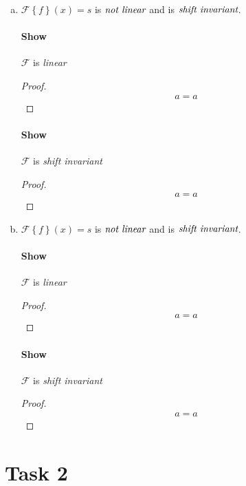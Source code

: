 \documentclass{paper}
\begin{document}
\begin{enumerate}[(a)]
\item $\mathcal{F} \left \{ f \right\} (x) = s$ is $\emph{not linear}$ and is $\emph{shift invariant}$.

\paragraph{Show} $\mathcal{F}$ is \emph{linear} \\
\begin{proof}
\begin{align*}
    a = a
\end{align*}
\end{proof}

\paragraph{Show} $\mathcal{F}$ is \emph{shift invariant} \\
\begin{proof}
\begin{align*}
    a = a
\end{align*}
\end{proof}

\item $\mathcal{F} \left \{ f \right\} (x) = s$ is $\emph{not linear}$ and is $\emph{shift invariant}$.

\paragraph{Show} $\mathcal{F}$ is \emph{linear} \\
\begin{proof}
\begin{align*}
    a = a
\end{align*}
\end{proof}

\paragraph{Show} $\mathcal{F}$ is \emph{shift invariant} \\
\begin{proof}
\begin{align*}
    a = a
\end{align*}
\end{proof}


\end{enumerate}

    
\section*{Task 2}
\end{document}
